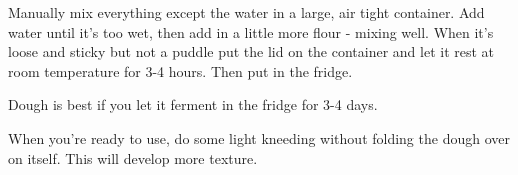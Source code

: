 \begin{recipe}

Manually mix everything except the water in a large, air tight container. Add water until it's too wet, then add in a little more flour - mixing well. When it's loose and sticky but not a puddle put the lid on the container and let it rest at room temperature for 3-4 hours. Then put in the fridge.

Dough is best if you let it ferment in the fridge for 3-4 days.

When you're ready to use, do some light kneeding without folding the dough over on itself. This will develop more texture.

\end{recipe}
